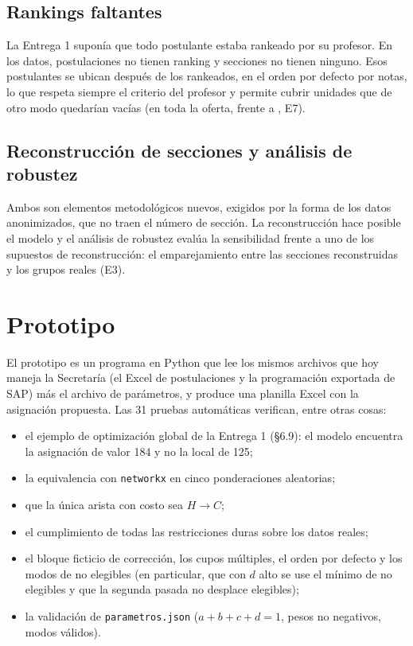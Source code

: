 \documentclass{article}
\begin{document}
\subsection{Rankings faltantes}
La Entrega 1 suponía que todo postulante estaba rankeado por su profesor. En los datos, \sinRankPost{} postulaciones no tienen ranking y \sinRankSecciones{} secciones no tienen ninguno. Esos postulantes se ubican después de los rankeados, en el orden por defecto por notas, lo que respeta siempre el criterio del profesor y permite cubrir unidades que de otro modo quedarían vacías (en toda la oferta, \capBaseOf{} frente a \capSinRankOf, E7).

\subsection{Reconstrucción de secciones y análisis de robustez}
Ambos son elementos metodológicos nuevos, exigidos por la forma de los datos anonimizados, que no traen el número de sección. La reconstrucción hace posible el modelo y el análisis de robustez evalúa la sensibilidad frente a uno de los supuestos de reconstrucción: el emparejamiento entre las secciones reconstruidas y los grupos reales (E3).

\section{Prototipo}
\label{sec:prototipo}

El prototipo es un programa en Python que lee los mismos archivos que hoy maneja la Secretaría (el Excel de postulaciones y la programación exportada de SAP) más el archivo de parámetros, y produce una planilla Excel con la asignación propuesta. Las 31 pruebas automáticas verifican, entre otras cosas:
\begin{itemize}
    \item el ejemplo de optimización global de la Entrega 1 (§6.9): el modelo encuentra la asignación de valor 184 y no la local de 125;
    \item la equivalencia con \texttt{networkx} en cinco ponderaciones aleatorias;
    \item que la única arista con costo sea $H \to C$;
    \item el cumplimiento de todas las restricciones duras sobre los datos reales;
    \item el bloque ficticio de corrección, los cupos múltiples, el orden por defecto y los modos de no elegibles (en particular, que con $d$ alto se use el mínimo de no elegibles y que la segunda pasada no desplace elegibles);
    \item la validación de \texttt{parametros.json} ($a + b + c + d = 1$, pesos no negativos, modos válidos).
\end{itemize}
\end{document}
